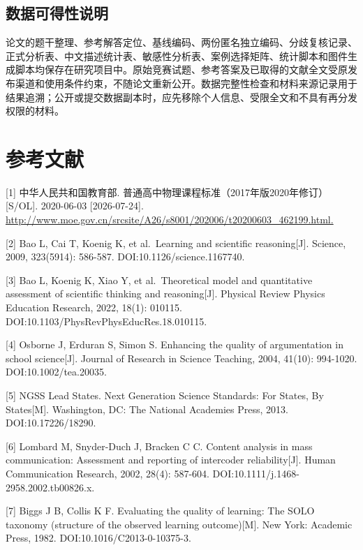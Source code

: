 \documentclass[
  12pt,
  a4paper,twoside,openany]{ctexbook}
\begin{document}
\section{数据可得性说明}\label{ux6570ux636eux53efux5f97ux6027ux8bf4ux660e}

论文的题干整理、参考解答定位、基线编码、两份匿名独立编码、分歧复核记录、正式分析表、中文描述统计表、敏感性分析表、案例选择矩阵、统计脚本和图件生成脚本均保存在研究项目中。原始竞赛试题、参考答案及已取得的文献全文受原发布渠道和使用条件约束，不随论文重新公开。数据完整性检查和材料来源记录用于结果追溯；公开或提交数据副本时，应先移除个人信息、受限全文和不具有再分发权限的材料。

\chapter*{参考文献}\begingroup\setlength{\leftskip}{2em}\setlength{\parindent}{-2em}\setlength{\parskip}{3pt}\label{ux53c2ux8003ux6587ux732e}

{[}1{]} 中华人民共和国教育部.
普通高中物理课程标准（2017年版2020年修订）{[}S/OL{]}. 2020-06-03
{[}2026-07-24{]}.
\url{http://www.moe.gov.cn/srcsite/A26/s8001/202006/t20200603_462199.html.}

{[}2{]} Bao L, Cai T, Koenig K, et al.~Learning and scientific
reasoning{[}J{]}. Science, 2009, 323(5914): 586-587.
DOI:10.1126/science.1167740.

{[}3{]} Bao L, Koenig K, Xiao Y, et al.~Theoretical model and
quantitative assessment of scientific thinking and reasoning{[}J{]}.
Physical Review Physics Education Research, 2022, 18(1): 010115.
DOI:10.1103/PhysRevPhysEducRes.18.010115.

{[}4{]} Osborne J, Erduran S, Simon S. Enhancing the quality of
argumentation in school science{[}J{]}. Journal of Research in Science
Teaching, 2004, 41(10): 994-1020. DOI:10.1002/tea.20035.

{[}5{]} NGSS Lead States. Next Generation Science Standards: For States,
By States{[}M{]}. Washington, DC: The National Academies Press, 2013.
DOI:10.17226/18290.

{[}6{]} Lombard M, Snyder-Duch J, Bracken C C. Content analysis in mass
communication: Assessment and reporting of intercoder
reliability{[}J{]}. Human Communication Research, 2002, 28(4): 587-604.
DOI:10.1111/j.1468-2958.2002.tb00826.x.

{[}7{]} Biggs J B, Collis K F. Evaluating the quality of learning: The
SOLO taxonomy (structure of the observed learning outcome){[}M{]}. New
York: Academic Press, 1982. DOI:10.1016/C2013-0-10375-3.
\end{document}
